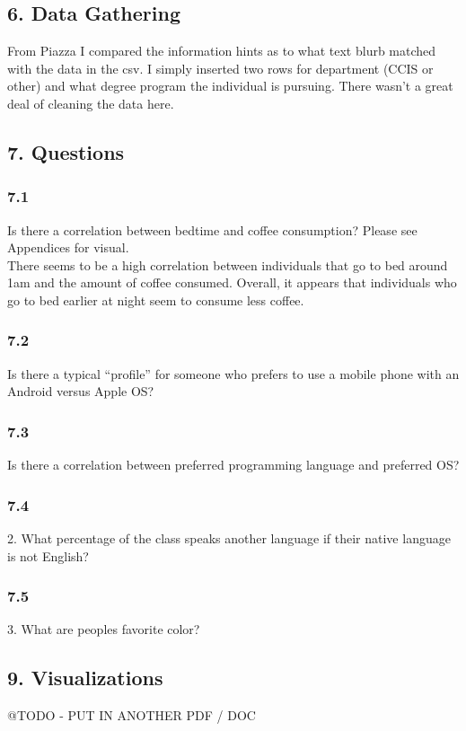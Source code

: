 \documentclass{neu_handout}
\begin{document}
\subsection*{6. Data Gathering}
From Piazza I compared the information hints as to what text blurb matched with the data in the csv. I simply inserted two rows for department (CCIS or other) and what degree program the individual is pursuing. There wasn't a great deal of cleaning the data here.

\subsection*{7. Questions}

\subsubsection*{7.1}
Is there a correlation between bedtime and coffee consumption? Please see Appendices for visual.\\

There seems to be a high correlation between individuals that go to bed around 1am and the amount of coffee consumed. Overall, it appears that individuals who go to bed earlier at night seem to consume less coffee.

\subsubsection*{7.2}
Is there a typical “profile” for someone who prefers to use a mobile phone with an
Android versus Apple OS?

\subsubsection*{7.3}
Is there a correlation between preferred programming language and preferred OS?

\subsubsection*{7.4}
2. What percentage of the class speaks another language if their native language is not English?

\subsubsection*{7.5}
3. What are peoples favorite color?

\subsection*{9. Visualizations}
@TODO - PUT IN ANOTHER PDF / DOC
\end{document}
